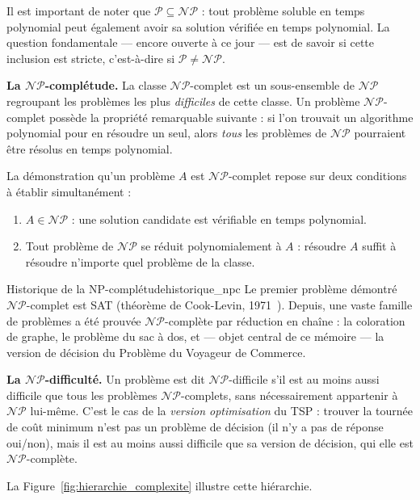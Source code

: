 \documentclass[12pt, a4paper, twoside, openright]{book}
\begin{document}
	Il est important de noter que $\mathcal{P} \subseteq \mathcal{NP}$ :
	tout problème soluble en temps polynomial peut également avoir sa solution
	vérifiée en temps polynomial. La question fondamentale --- encore ouverte
	à ce jour --- est de savoir si cette inclusion est stricte, c'est-à-dire
	si $\mathcal{P} \neq \mathcal{NP}$.
	
	\textbf{La $\mathcal{NP}$-complétude.}
	La classe $\mathcal{NP}$-complet est un sous-ensemble de $\mathcal{NP}$
	regroupant les problèmes les plus \textit{difficiles} de cette classe.
	Un problème $\mathcal{NP}$-complet possède la propriété remarquable
	suivante : si l'on trouvait un algorithme polynomial pour en résoudre un
	seul, alors \textit{tous} les problèmes de $\mathcal{NP}$ pourraient être
	résolus en temps polynomial.
	
	La démonstration qu'un problème $A$ est $\mathcal{NP}$-complet repose sur
	deux conditions à établir simultanément :
	\begin{enumerate}
		\item $A \in \mathcal{NP}$ : une solution candidate est vérifiable en
		temps polynomial.
		\item Tout problème de $\mathcal{NP}$ se réduit polynomialement à $A$ :
		résoudre $A$ suffit à résoudre n'importe quel problème de la classe.
	\end{enumerate}
	
	\begin{remark}{Historique de la NP-complétude}{historique_npc}
		Le premier problème démontré $\mathcal{NP}$-complet est SAT (théorème
		de Cook-Levin, 1971~\cite{cook1971complexity}). Depuis, une vaste famille de problèmes a été
		prouvée $\mathcal{NP}$-complète par réduction en chaîne : la coloration
		de graphe, le problème du sac à dos, et --- objet central de ce mémoire
		--- la version de décision du Problème du Voyageur de Commerce.
	\end{remark}
	
	\textbf{La $\mathcal{NP}$-difficulté.}
	Un problème est dit $\mathcal{NP}$-difficile s'il est au moins aussi
	difficile que tous les problèmes $\mathcal{NP}$-complets, sans
	nécessairement appartenir à $\mathcal{NP}$ lui-même. C'est le cas de la
	\textit{version optimisation} du TSP : trouver la tournée de coût minimum
	n'est pas un problème de décision (il n'y a pas de réponse oui/non), mais
	il est au moins aussi difficile que sa version de décision, qui elle est
	$\mathcal{NP}$-complète.
	
	La Figure~\ref{fig:hierarchie_complexite} illustre cette hiérarchie.
	
\end{document}
